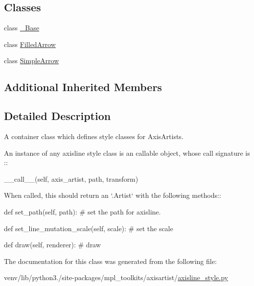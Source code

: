 \subsection*{Classes}
\begin{DoxyCompactItemize}
\item 
class \hyperlink{classaxisartist_1_1axisline__style_1_1AxislineStyle_1_1__Base}{\+\_\+\+Base}
\item 
class \hyperlink{classaxisartist_1_1axisline__style_1_1AxislineStyle_1_1FilledArrow}{Filled\+Arrow}
\item 
class \hyperlink{classaxisartist_1_1axisline__style_1_1AxislineStyle_1_1SimpleArrow}{Simple\+Arrow}
\end{DoxyCompactItemize}
\subsection*{Additional Inherited Members}


\subsection{Detailed Description}
\begin{DoxyVerb}A container class which defines style classes for AxisArtists.

An instance of any axisline style class is an callable object,
whose call signature is ::

   __call__(self, axis_artist, path, transform)

When called, this should return an `.Artist` with the following methods::

  def set_path(self, path):
      # set the path for axisline.

  def set_line_mutation_scale(self, scale):
      # set the scale

  def draw(self, renderer):
      # draw
\end{DoxyVerb}
 

The documentation for this class was generated from the following file\+:\begin{DoxyCompactItemize}
\item 
venv/lib/python3./site-\/packages/mpl\+\_\+toolkits/axisartist/\hyperlink{axisartist_2axisline__style_8py}{axisline\+\_\+style.\+py}\end{DoxyCompactItemize}

